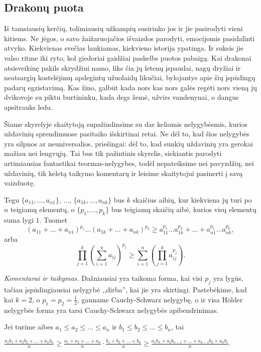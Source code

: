\newpage
\subsection{Drakonų puota}

Iš tamsiausių kerčių, tolimiausių užkampių susirinko jos ir jie pasirodyti
vieni kitiems. Ne jėgos, o savo žaižaruojačios išvaizdos parodyti, emocijomis
pasidalinti atvyko. Kiekvienas svečias laukiamas, kiekvieno istorija ypatinga.
Ir suksis jie valso ritme iki ryto, kol giedoriai gaidžiai paskelbs puotos
pabaigą. Kai drakonai atsisveikinę pakils skrydžiui namo, liks čia jų letenų
įspaudai, nagų dryžiai ir neatsargių kostelėjimų apdegintų užuolaidų likučiai,
bylojantys apie šių įspūdingų padarų egzistavimą. Kas žino, galbūt kada nors
kas nors galės regėti nors vieną jų dvikovoje su piktu burtininku, kada degs
žemė, užvirs vandenynai, o dangus apsitrauks ledu.

Šiame skyrelyje skaitytoją supažindinsime su dar keliomis nelygybėsmis, kurios
uždavinių sprendimuose pasitaiko išskirtinai retai. Ne dėl to, kad šios
nelygybės yra silpnos ar neuniversalios, priešingai: dėl to, kad sunkių
uždavinių yra gerokai mažiau nei lengvųjų. Tai bus tik pažintinis skyrelis,
siekiantis parodyti artimiausias fantastikai teormas-nelygybes, todėl
nepateiksime nei pavyzdžių, nei uždavinių, tik keletą taikymo komentarų ir
leisime skaitytojui pasinerti į savą vaizduotę.

\begin{thm}[H\"{o}lder]
  Tegu $\{a_{11},\ldots,a_{n1}\}$, $\ldots$, $\{a_{1k},\ldots,a_{nk}\}$ bus $k$
  skaičius aibių, kur kiekviena jų turi po $n$ teigiamų elementų, o
  $\{p_1,\ldots,p_k\}$ bus teigiamų skaičių aibė, kurios visų elementų suma
  lygi $1$. Tuomet
  $$(a_{11}+\ldots+a_{n1})^{p_1}\ldots(a_{1k}+\ldots+a_{nk})^{p_k}\geq
  a_{11}^{p_1}\ldots a_{1k}^{p_k}+\ldots+a_{n1}^{p_1}\ldots a_{nk}^{p_k},$$
  arba
  $$\prod_{j=1}^{k}{\left(\sum_{i=1}^{n}{a_{ij}}\right)^{p_j}}\geq\sum_{i=1}^{n}{\left(\prod_{j=1}^{k}{a_{ij}^{p_j}}\right)}.$$
\end{thm}

\noindent \textit{Komentarai ir taikymas.} Dažniausiai yra taikoma forma,
kai visi $p_j$ yra lygūs, tačiau įspūdingiausiai nelygybė ,,dirba'', kai
jie yra skirtingi. Pastebėkime, kad kai $k=2$, o $p_1=p_2=\frac{1}{2}$,
gauname Cauchy-Schwarz nelygybę, o ir visa H\"{o}lder nelygybės forma yra
tarsi Cauchy-Schwarz nelygybės apibendrinimas.

\begin{thm}[Chebyshev] Jei turime aibes $a_1\leq a_2\leq\ldots\leq
  a_n$ ir $b_1\leq b_2\leq\ldots\leq b_n$, tai \begin{center}
    $\frac{a_1b_1+a_2b_2+\ldots+a_nb_n}{n}\geq\frac{a_1+a_2+\ldots+a_n}{n}\cdot\frac{b_1+b_2+\ldots+b_n}{n}\geq\frac{a_1b_n+a_2b_{n-1}+\ldots+a_{n-1}b_2+a_nb_1}{n}.$
  \end{center}
\end{thm}

